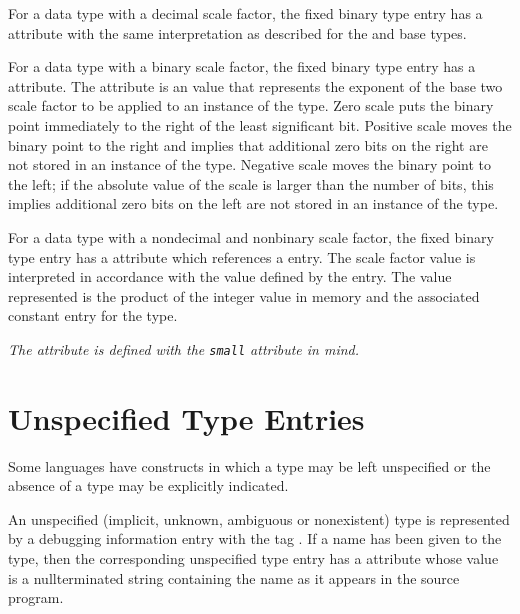 For a data type with a decimal scale factor, the fixed binary
type entry has a 
\DWATdecimalscale{} attribute 
with the same
interpretation as described for the 
\DWATEpackeddecimal{}
and \DWATEnumericstring{} base types.

\hypertarget{chap:DWATbinaryscalebinaryscalefactorforfixedpointtype}{}
For a data type with a binary scale factor, the fixed
binary type entry has a 
\DWATbinaryscale{} attribute. 
The
\DWATbinaryscale{} attribute 
is an  value
that represents the exponent of the base two scale factor to
be applied to an instance of the type.  Zero scale puts the
binary point immediately to the right of the least significant
bit. Positive scale moves the binary point to the right and
implies that additional zero bits on the right are not stored
in an instance of the type. Negative scale moves the binary
point to the left; if the absolute value of the scale is
larger than the number of bits, this implies additional zero
bits on the left are not stored in an instance of the type.

For 
\hypertarget{chap:DWATsmallscalefactorforfixedpointtype}{}
a data type with a non\dash decimal and non\dash binary scale factor,
the fixed binary type entry has a 
\DWATsmall{} attribute which
references a 
\DWTAGconstant{} entry. The scale factor value
is interpreted in accordance with the value defined by the
\DWTAGconstant{} entry. The value represented is the product
of the integer value in memory and the associated constant
entry for the type.

\textit{The \DWATsmall{} attribute 
is defined with the  \texttt{small}
attribute in mind.}

\section{Unspecified Type Entries}
\label{chap:unspecifiedtypeentries}
Some languages have constructs in which a type 
may be left unspecified or the absence of a type
may be explicitly indicated.

An unspecified (implicit, unknown, ambiguous or nonexistent)
type is represented by a debugging information entry with
the tag \DWTAGunspecifiedtypeTARG. 
If a name has been given
to the type, then the corresponding unspecified type entry
has a \DWATname{} attribute 
whose value is
a null\dash terminated
string containing the name as it appears in the source program.


